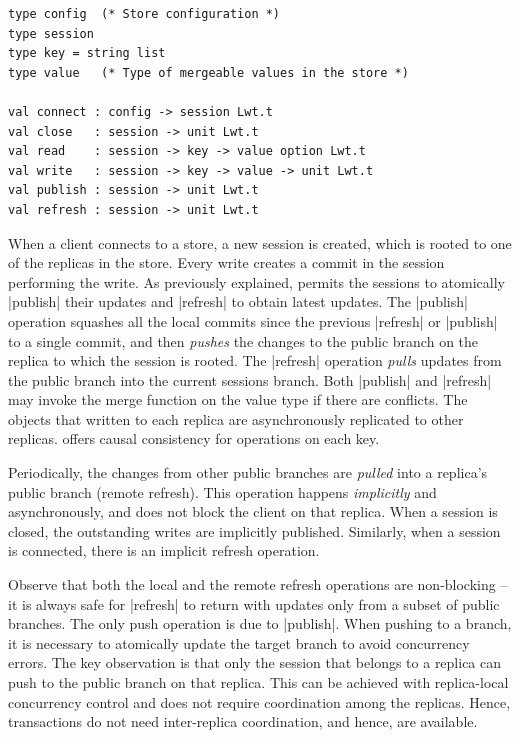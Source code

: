 \begin{lstlisting}
type config  (* Store configuration *)
type session
type key = string list
type value   (* Type of mergeable values in the store *)

val connect : config -> session Lwt.t
val close   : session -> unit Lwt.t
val read    : session -> key -> value option Lwt.t
val write   : session -> key -> value -> unit Lwt.t
val publish : session -> unit Lwt.t
val refresh : session -> unit Lwt.t
\end{lstlisting}

When a client connects to a \name store, a new session is created, which is
rooted to one of the replicas in the store. Every write creates a commit in the
session performing the write. As previously explained, \name permits the
sessions to atomically |publish| their updates and |refresh| to obtain latest
updates. The |publish| operation squashes all the local commits since the
previous |refresh| or |publish| to a single commit, and then \emph{pushes} the
changes to the public branch on the replica to which the session is rooted. The
|refresh| operation \emph{pulls} updates from the public branch into the
current sessions branch. Both |publish| and |refresh| may invoke the merge
function on the value type if there are conflicts. The objects that written to
each replica are asynchronously replicated to other replicas. \name offers
causal consistency for operations on each key.

Periodically, the changes from other public branches are \emph{pulled} into a
replica's public branch (remote refresh). This operation happens
\emph{implicitly} and asynchronously, and does not block the client on that
replica. When a session is closed, the outstanding writes are implicitly
published. Similarly, when a session is connected, there is an implicit refresh
operation.

Observe that both the local and the remote refresh operations are non-blocking
-- it is always safe for |refresh| to return with updates only from a subset of
public branches. The only push operation is due to |publish|. When pushing to a
branch, it is necessary to atomically update the target branch to avoid
concurrency errors. The key observation is that only the session that belongs
to a replica can push to the public branch on that replica. This can be
achieved with replica-local concurrency control and does not require
coordination among the replicas. Hence, \name transactions do not need
inter-replica coordination, and hence, are available.

